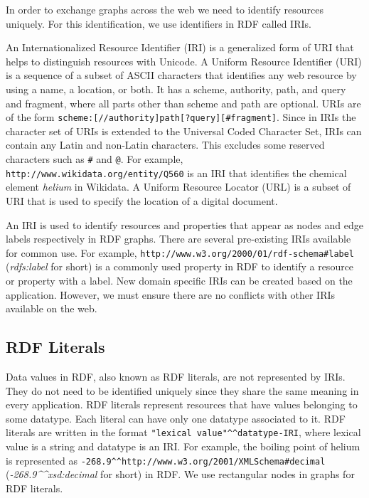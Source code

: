 In order to exchange graphs across the web we need to identify resources uniquely. For this identification, we use identifiers in RDF called IRIs. 

An Internationalized Resource Identifier (IRI) is a generalized form of URI that helps to distinguish resources with Unicode. A Uniform Resource Identifier (URI) is a sequence of a subset of ASCII characters that identifies any web resource by using a name, a location, or both. It has a scheme, authority, path, and query and fragment, where all parts other than scheme and path are optional. URIs are of the form \texttt{scheme:[//authority]path[?query][\#fragment]}. 
Since in IRIs the character set of URIs is extended to the Universal Coded Character Set, IRIs can contain any Latin and non-Latin characters. This excludes some reserved characters such as \texttt{\#} and \texttt{@}. For example, \texttt{http://www.wikidata.org/entity/Q560} is an IRI that identifies the chemical element \textit{helium} in Wikidata. A Uniform Resource Locator (URL) is a subset of URI that is used to specify the location of a digital document.

An IRI is used to identify resources and properties that appear as nodes and edge labels respectively in RDF graphs. There are several pre-existing IRIs available for common use. For example, \texttt{http://www.w3.org/2000/01/rdf-schema\#label} (\textit{rdfs:label} for short) is a commonly used property in RDF to identify a resource or property with a label. New domain specific IRIs can be created based on the application. However, we must ensure there are no conflicts with other IRIs available on the web.

\subsection{RDF Literals}
\label{subsec:rdf-literals}

Data values in RDF, also known as RDF literals, are not represented by IRIs. They do not need to be identified uniquely since they share the same meaning in every application. RDF literals represent resources that have values belonging to some datatype. Each literal can have only one datatype associated to it. RDF literals are written in the format \texttt{"lexical value"\textasciicircum \textasciicircum datatype-IRI}, where lexical value is a string and datatype is an IRI. For example, the boiling point of helium is represented as \texttt{-268.9\textasciicircum \textasciicircum http://www.w3.org/2001/XMLSchema\#decimal} (\textit{-268.9\textasciicircum \textasciicircum xsd:decimal} for short) in RDF. We use rectangular nodes in graphs for RDF literals.

